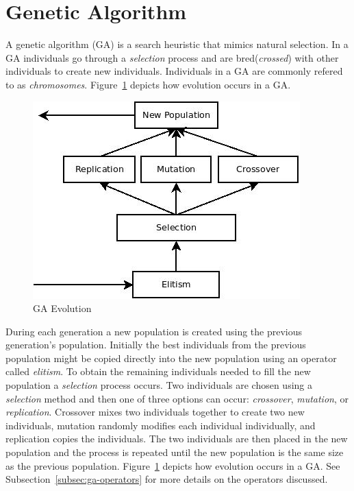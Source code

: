 \section{Genetic Algorithm}
\label{sec:ga}

A genetic algorithm (GA) is a search heuristic that mimics natural selection. In a GA individuals go through a \textit{selection} process and are bred(\textit{crossed}) with other individuals to create new individuals. Individuals in a GA are commonly refered to as \textit{chromosomes}. Figure~\ref{fig:gaFlowchart} depicts how evolution occurs in a GA.

\begin{figure}[H]
  \centering
  \includegraphics[bb=0 0 288 390,scale=0.5]{figures/GA.jpeg}
  \caption{GA Evolution}
  \label{fig:gaFlowchart}
\end{figure}

During each generation a new population is created using the previous generation's population. Initially the best individuals from the previous population might be copied directly into the new population using an operator called \textit{elitism}. To obtain the remaining individuals needed to fill the new population a \textit{selection} process occurs. Two individuals are chosen using a \textit{selection} method and then one of three options can occur: \textit{crossover}, \textit{mutation}, or \textit{replication}. Crossover mixes two individuals together to create two new individuals, mutation randomly modifies each individual individually, and replication copies the individuals. The two individuals are then placed in the new population and the process is repeated until the new population is the same size as the previous population. Figure~\ref{fig:gaFlowchart} depicts how evolution occurs in a GA. See Subsection~\ref{subsec:ga-operators} for more details on the operators discussed.

